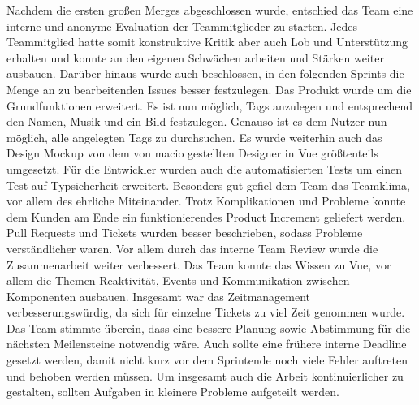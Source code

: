 \documentclass[10pt, a4paper]{article}
\begin{document}
\begin{onehalfspace}
Nachdem die ersten großen Merges abgeschlossen wurde, entschied das Team eine interne und anonyme Evaluation der Teammitglieder zu starten.
Jedes Teammitglied hatte somit konstruktive Kritik aber auch Lob und Unterstützung erhalten und konnte an den eigenen Schwächen arbeiten und Stärken weiter ausbauen.
Darüber hinaus wurde auch beschlossen, in den folgenden Sprints die Menge an zu bearbeitenden Issues besser festzulegen.
Das Produkt wurde um die Grundfunktionen erweitert.
Es ist nun möglich, Tags anzulegen und entsprechend den Namen, Musik und ein Bild festzulegen.
Genauso ist es dem Nutzer nun möglich, alle angelegten Tags zu durchsuchen.
Es wurde weiterhin auch das Design Mockup von dem von macio gestellten Designer in Vue größtenteils umgesetzt.
Für die Entwickler wurden auch die automatisierten Tests um einen Test auf Typsicherheit erweitert.
Besonders gut gefiel dem Team das Teamklima, vor allem des ehrliche Miteinander.
Trotz Komplikationen und Probleme konnte dem Kunden am Ende ein funktionierendes Product Increment geliefert werden.
Pull Requests und Tickets wurden besser beschrieben, sodass Probleme verständlicher waren.
Vor allem durch das interne Team Review wurde die Zusammenarbeit weiter verbessert.
Das Team konnte das Wissen zu Vue, vor allem die Themen Reaktivität, Events und Kommunikation zwischen Komponenten ausbauen.
Insgesamt war das Zeitmanagement verbesserungswürdig, da sich für einzelne Tickets zu viel Zeit genommen wurde.
Das Team stimmte überein, dass eine bessere Planung sowie Abstimmung für die nächsten Meilensteine notwendig wäre.
Auch sollte eine frühere interne Deadline gesetzt werden, damit nicht kurz vor dem Sprintende noch viele Fehler auftreten und behoben werden müssen.
Um insgesamt auch die Arbeit kontinuierlicher zu gestalten, sollten Aufgaben in kleinere Probleme aufgeteilt werden.



\end{onehalfspace}
\end{document}
